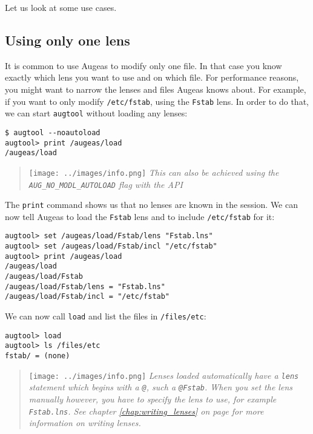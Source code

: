 Let us look at some use cases.

\subsection{Using only one lens}

It is common to use Augeas to modify only one file. In that case you know exactly which lens you want to use and on which file. For performance reasons, you might want to narrow the lenses and files Augeas knows about. For example, if you want to only modify \verb!/etc/fstab!, using the \verb!Fstab! lens. In order to do that, we can start \verb!augtool! without loading any lenses:


\begin{verbatim}
$ augtool --noautoload
augtool> print /augeas/load
/augeas/load
\end{verbatim}

\begin{quote}
\texttt{[image: ../images/info.png]} \emph{This can also be achieved using the \texttt{AUG\_NO\_MODL\_AUTOLOAD} flag with the API}

\end{quote}
The \verb!print! command shows us that no lenses are known in the session. We can now tell Augeas to load the \verb!Fstab! lens and to include \verb!/etc/fstab! for it:

 

\begin{verbatim}
augtool> set /augeas/load/Fstab/lens "Fstab.lns"
augtool> set /augeas/load/Fstab/incl "/etc/fstab"
augtool> print /augeas/load
/augeas/load
/augeas/load/Fstab
/augeas/load/Fstab/lens = "Fstab.lns"
/augeas/load/Fstab/incl = "/etc/fstab"
\end{verbatim}
We can now call \verb!load! and list the files in \verb!/files/etc!:

 

\begin{verbatim}
augtool> load
augtool> ls /files/etc
fstab/ = (none)
\end{verbatim}
\begin{quote}
\texttt{[image: ../images/info.png]} \emph{Lenses loaded automatically have a \texttt{lens} statement which begins with a \texttt{@}, such a \texttt{@Fstab}. When you set the lens manually however, you have to specify the lens to use, for example \texttt{Fstab.lns}. See chapter \ref{chap:writing_lenses} on page \pageref{chap:writing_lenses} for more information on writing lenses.}

\end{quote}
